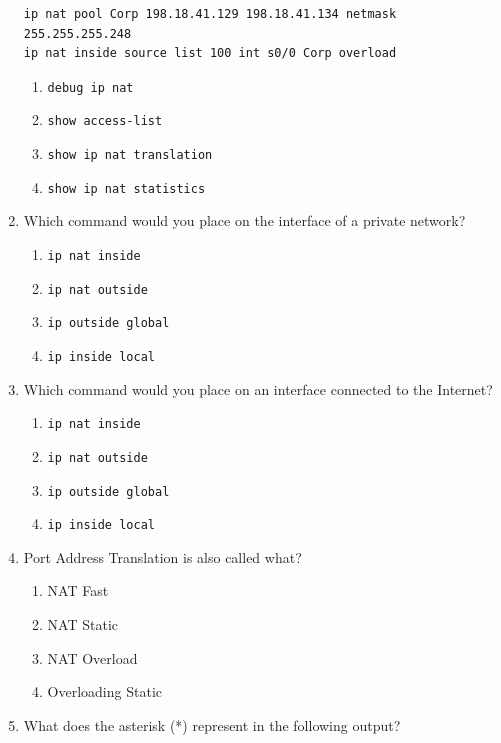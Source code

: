 \documentclass[b5paper,11pt]{memoir}
\begin{document}
\begin{enumerate}
\begin{verbatim}
ip nat pool Corp 198.18.41.129 198.18.41.134 netmask 255.255.255.248
ip nat inside source list 100 int s0/0 Corp overload
\end{verbatim}

  \begin{enumerate}
  \tightlist
  \item
    \texttt{debug\ ip\ nat}
  \item
    \texttt{show\ access-list}
  \item
    \texttt{show\ ip\ nat\ translation}
  \item
    \texttt{show\ ip\ nat\ statistics}
  \end{enumerate}
\item
  Which command would
  you place on the interface of a private network?

  \begin{enumerate}
  \tightlist
  \item
    \texttt{ip\ nat\ inside}
  \item
    \texttt{ip\ nat\ outside}
  \item
    \texttt{ip\ outside\ global}
  \item
    \texttt{ip\ inside\ local}
  \end{enumerate}
\item
  Which command would you place on an interface connected to the
  Internet?

  \begin{enumerate}
  \tightlist
  \item
    \texttt{ip\ nat\ inside}
  \item
    \texttt{ip\ nat\ outside}
  \item
    \texttt{ip\ outside\ global}
  \item
    \texttt{ip\ inside\ local}
  \end{enumerate}
\item
  Port Address Translation is also called what?

  \begin{enumerate}
  \tightlist
  \item
    NAT Fast
  \item
    NAT Static
  \item
    NAT Overload
  \item
    Overloading Static
  \end{enumerate}
\item
  What does the asterisk (*) represent in the following output?


\end{enumerate}
\end{document}
